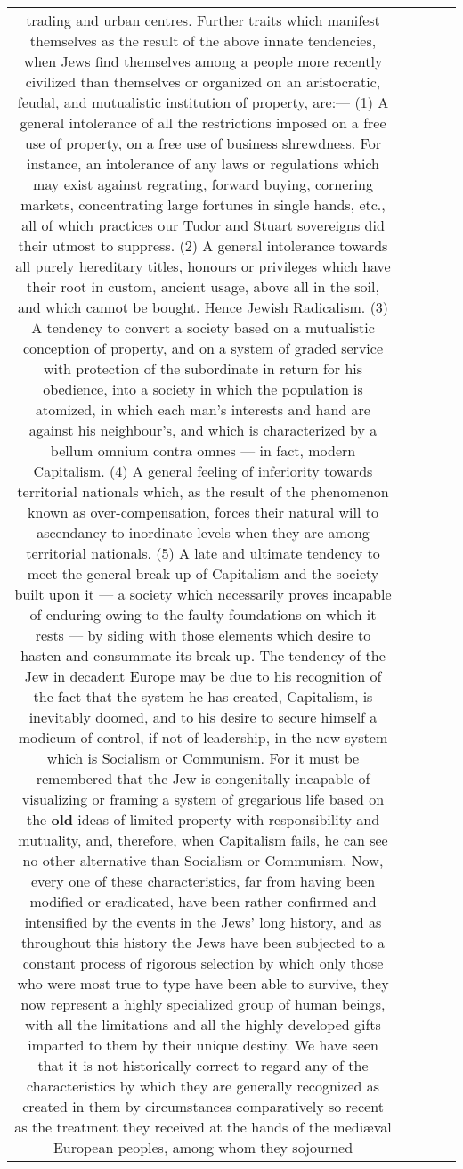 \documentclass[11pt]{article}
\newlength\mylength
\begin{document}
\begin{center}
\begin{longtable}{|C{.65\mylength}|C{.30\mylength}|C{.12\mylength}|C{.12\mylength}|C{.12\mylength}|}
trading and urban centres.    Further traits which manifest themselves as the result of the above innate tendencies, when Jews find themselves among a people more recently civilized than themselves or organized on an aristocratic, feudal, and mutualistic institution of property, are:—    (1) A general intolerance of all the restrictions imposed on a free use of property, on a free use of business shrewdness. For instance, an intolerance of any laws or regulations which may exist against regrating, forward buying, cornering markets, concentrating large fortunes in single hands, etc., all of which practices our Tudor and Stuart sovereigns did their utmost to suppress.    (2) A general intolerance towards all purely hereditary titles, honours or privileges which have their root in custom, ancient usage, above all in the soil, and which cannot be bought. Hence Jewish Radicalism.    (3) A tendency to convert a society based on a mutualistic conception of property, and on a system of graded service with protection of the subordinate in return for his obedience, into a society in which the population is atomized, in which each man's interests and hand are against his neighbour's, and which is characterized by a bellum omnium contra omnes — in fact, modern Capitalism. (4) A general feeling of inferiority towards territorial nationals which, as the result of the phenomenon known as over-compensation, forces their natural will to ascendancy to inordinate levels when they are among territorial nationals.    (5) A late and ultimate tendency to meet the general break-up of Capitalism and the society built upon it — a society which necessarily proves incapable of enduring owing to the faulty foundations on which it rests — by siding with those elements which desire to hasten and consummate its break-up. The tendency of the Jew in decadent Europe may be due to his recognition of the fact that the system he has created, Capitalism, is inevitably doomed, and to his desire to secure himself a modicum of control, if not of leadership, in the new system which is Socialism or Communism. For it must be remembered that the Jew is congenitally incapable of visualizing or framing a system of gregarious life based on the \textbf{old} ideas of limited property with responsibility and mutuality, and, therefore, when Capitalism fails, he can see no other alternative than Socialism or Communism.    Now, every one of these characteristics, far from having been modified or eradicated, have been rather confirmed and intensified by the events in the Jews' long history, and as throughout this history the Jews have been subjected to a constant process of rigorous selection by which only those who were most true to type have been able to survive, they now represent a highly specialized group of human beings, with all the limitations and all the highly developed gifts imparted to them by their unique destiny.    We have seen that it is not historically correct to regard any of the characteristics by which they are generally recognized as created in them by circumstances comparatively so recent as the treatment they received at the hands of the mediæval European peoples, among whom they sojourned 
\end{longtable}
\end{center}
\end{document}
